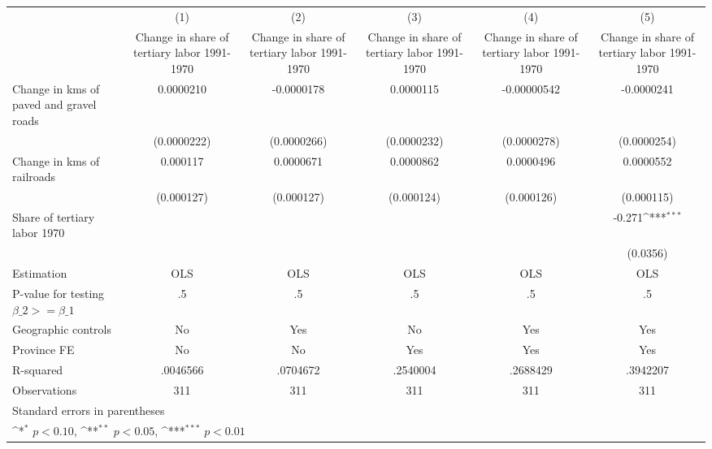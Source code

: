 {
\def\sym#1{\ifmmode^{#1}\else\(^{#1}\)\fi}
\begin{tabular}{l*{5}{c}}
\hline\hline
                    &\multicolumn{1}{c}{(1)}&\multicolumn{1}{c}{(2)}&\multicolumn{1}{c}{(3)}&\multicolumn{1}{c}{(4)}&\multicolumn{1}{c}{(5)}\\
                    &\multicolumn{1}{c}{Change in share of tertiary labor 1991-1970}&\multicolumn{1}{c}{Change in share of tertiary labor 1991-1970}&\multicolumn{1}{c}{Change in share of tertiary labor 1991-1970}&\multicolumn{1}{c}{Change in share of tertiary labor 1991-1970}&\multicolumn{1}{c}{Change in share of tertiary labor 1991-1970}\\
\hline
Change in kms of paved and gravel roads&   0.0000210         &  -0.0000178         &   0.0000115         & -0.00000542         &  -0.0000241         \\
                    & (0.0000222)         & (0.0000266)         & (0.0000232)         & (0.0000278)         & (0.0000254)         \\
[1em]
Change in kms of railroads&    0.000117         &   0.0000671         &   0.0000862         &   0.0000496         &   0.0000552         \\
                    &  (0.000127)         &  (0.000127)         &  (0.000124)         &  (0.000126)         &  (0.000115)         \\
[1em]
Share of tertiary labor 1970&                     &                     &                     &                     &      -0.271\sym{***}\\
                    &                     &                     &                     &                     &    (0.0356)         \\
\hline
Estimation          &         OLS         &         OLS         &         OLS         &         OLS         &         OLS         \\
P-value for testing $\beta\_2 >= \beta\_1$&          .5         &          .5         &          .5         &          .5         &          .5         \\
Geographic controls &          No         &         Yes         &          No         &         Yes         &         Yes         \\
Province FE         &          No         &          No         &         Yes         &         Yes         &         Yes         \\
R-squared           &    .0046566         &    .0704672         &    .2540004         &    .2688429         &    .3942207         \\
Observations        &         311         &         311         &         311         &         311         &         311         \\
\hline\hline
\multicolumn{6}{l}{\footnotesize Standard errors in parentheses}\\
\multicolumn{6}{l}{\footnotesize \sym{*} \(p<0.10\), \sym{**} \(p<0.05\), \sym{***} \(p<0.01\)}\\
\end{tabular}
}
